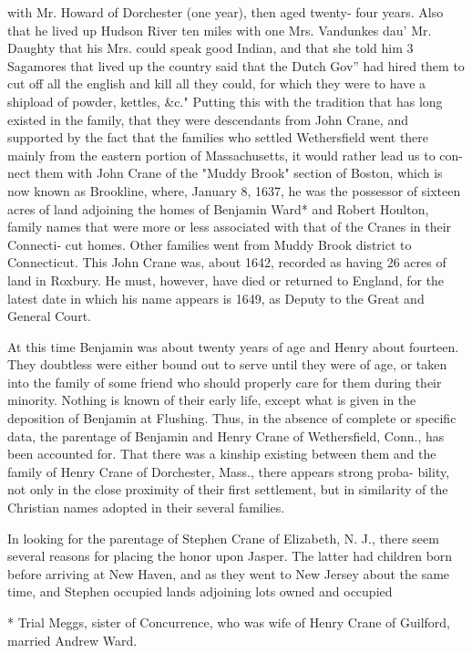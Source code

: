 with Mr. Howard of Dorchester (one year), then aged twenty- 
four years. Also that he lived up Hudson River ten miles 
with one Mrs. Vandunkes dau' Mr. Daughty that his Mrs. 
could speak good Indian, and that she told him 3 Sagamores that 
lived up the country said that the Dutch Gov'' had hired them to 
cut off all the english and kill all they could, for which they were 
to have a shipload of powder, kettles, \&c." Putting this with 
the tradition that has long existed in the family, that they were 
descendants from John Crane, and supported by the fact that 
the families who settled Wethersfield went there mainly from the 
eastern portion of Massachusetts, it would rather lead us to con- 
nect them with John Crane of the "Muddy Brook" section of 
Boston, which is now known as Brookline, where, January 8, 1637, 
he was the possessor of sixteen acres of land adjoining the homes 
of Benjamin Ward* and Robert Houlton, family names that were 
more or less associated with that of the Cranes in their Connecti- 
cut homes. Other families went from Muddy Brook district to 
Connecticut. This John Crane was, about 1642, recorded as 
having 26 acres of land in Roxbury. He must, however, have 
died or returned to England, for the latest date in which his name 
appears is 1649, as Deputy to the Great and General Court. 

At this time Benjamin was about twenty years of age and 
Henry about fourteen. They doubtless were either bound out to 
serve until they were of age, or taken into the family of some 
friend who should properly care for them during their minority. 
Nothing is known of their early life, except what is given in the 
deposition of Benjamin at Flushing. Thus, in the absence of 
complete or specific data, the parentage of Benjamin and Henry 
Crane of Wethersfield, Conn., has been accounted for. That 
there was a kinship existing between them and the family of 
Henry Crane of Dorchester, Mass., there appears strong proba- 
bility, not only in the close proximity of their first settlement, but 
in similarity of the Christian names adopted in their several 
families. 

In looking for the parentage of Stephen Crane of Elizabeth, 
N. J., there seem several reasons for placing the honor upon 
Jasper. The latter had children born before arriving at New 
Haven, and as they went to New Jersey about the same time, 
and Stephen occupied lands adjoining lots owned and occupied 

* Trial Meggs, sister of Concurrence, who was wife of Henry Crane 
of Guilford, married Andrew Ward. 



